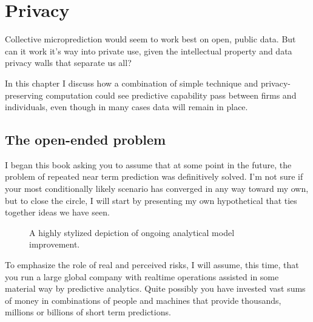 
\chapter{Privacy}


Collective microprediction would seem to work best on open, public data. But can it work it's way into private use, given the intellectual property and data privacy walls that separate us all? 

In this chapter I discuss how a combination of simple technique and privacy-preserving computation could see predictive capability pass between firms and individuals, even though in many cases data will remain in place. 





\label{chapter:privacy}

\label{story}

\section{The open-ended problem}

I began this book asking you to assume that at some point in the future, the problem of repeated near term prediction was definitively solved. I'm not sure if your most conditionally likely scenario has converged in any way toward my own, but to close the circle, I will start by presenting my own hypothetical that ties together ideas we have seen. 

 \begin{figure}
\label{fig:oracle}
\iftikz 
{}
\else 
\fi 
\caption{A highly stylized depiction of ongoing analytical model improvement.}
\label{fig:process}
\end{figure}

To emphasize the role of real and perceived risks, I will assume, this time, that you run a large global company with realtime operations assisted in some material way by predictive analytics. Quite possibly you have invested vast sums of money in combinations of people and machines that provide thousands, millions or billions of short term predictions. 

